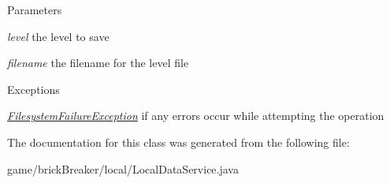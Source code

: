 \begin{DoxyParams}{Parameters}
\item[{\em level}]the level to save \item[{\em filename}]the filename for the level file\end{DoxyParams}

\begin{DoxyExceptions}{Exceptions}
\item[{\em \hyperlink{classbrick_breaker_1_1local_1_1_filesystem_failure_exception}{FilesystemFailureException}}]if any errors occur while attempting the operation \end{DoxyExceptions}


The documentation for this class was generated from the following file:\begin{DoxyCompactItemize}
\item 
game/brickBreaker/local/LocalDataService.java\end{DoxyCompactItemize}
